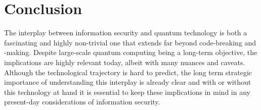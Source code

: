 \section{Conclusion} \label{conclusion}

The interplay between information security and quantum technology is both a fascinating and highly non-trivial one that extends far beyond code-breaking and -making. Despite large-scale quantum computing being a long-term objective, the implications are highly relevant today, albeit with many nuances and caveats. Although the technological trajectory is hard to predict, the long term strategic importance of understanding this interplay is already clear and with or without this technology at hand it is essential to keep these implications in mind in any present-day considerations of information security.
